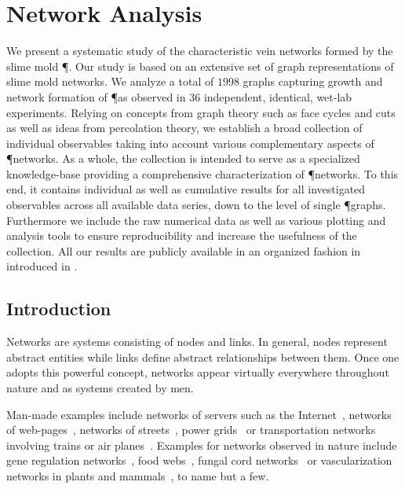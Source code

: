 \chapter{Network Analysis}\label{chap:analysis}

	We present a systematic study of the characteristic vein networks formed by the slime mold \P. Our study is based on an extensive set of graph representations of slime mold networks. We analyze a total of $1998$ graphs capturing growth and network formation of \P as observed in $36$ independent, identical, wet-lab experiments. Relying on concepts from graph theory such as face cycles and cuts as well as ideas from percolation theory, we establish a broad collection of individual observables taking into account various complementary aspects of \P networks. As a whole, the collection is intended to serve as a specialized knowledge-base providing a comprehensive characterization of \P networks. To this end, it contains individual as well as cumulative results for all investigated observables across all available data series, down to the level of single \P graphs. Furthermore we include the raw numerical data as well as various plotting and analysis tools to ensure reproducibility and increase the usefulness of the collection. All our results are publicly available in an organized fashion in \SMGR introduced in .

\section{Introduction}		

	Networks are systems consisting of nodes and links. In general, nodes represent abstract entities while links define abstract relationships between them. Once one adopts this powerful concept, networks appear virtually everywhere throughout nature and as systems created by men.

	Man-made examples include networks of servers such as the Internet~\cite{faloutsos1999power,karagiannis2004long,huberman1999internet}, networks of web-pages~\cite{adamic2000power}, networks of streets~\cite{jiang2004topological,buhl2006topological}, power grids~\cite{rohden2012self,zhongwei2004comparison} or transportation networks involving trains or air planes~\cite{barrat2004weighted,guimera2004modeling,sienkiewicz2005statistical,sen2003small}. Examples for networks observed in nature include gene regulation networks~\cite{alon1999robustness,milo2002network}, food webs~\cite{pimm1991food,montoya2006ecological}, fungal cord networks~\cite{fricker2007network,heaton2012analysis} or vascularization networks in plants and mammals~\cite{katifori2010damage,roth2001evolution,koizumi2000series}, to name but a few. 

